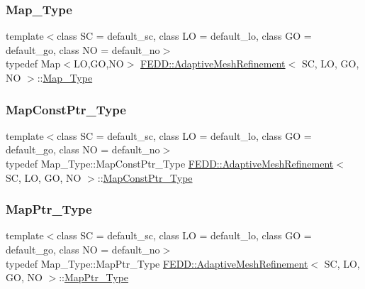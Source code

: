 \subsubsection{\texorpdfstring{Map\+\_\+\+Type}{Map\_Type}}
{\footnotesize\ttfamily template$<$class SC = default\+\_\+sc, class LO = default\+\_\+lo, class GO = default\+\_\+go, class NO = default\+\_\+no$>$ \\
typedef Map$<$LO,GO,NO$>$ \hyperlink{classFEDD_1_1AdaptiveMeshRefinement}{F\+E\+D\+D\+::\+Adaptive\+Mesh\+Refinement}$<$ SC, LO, GO, NO $>$\+::\hyperlink{classFEDD_1_1AdaptiveMeshRefinement_af60419a5ef8a4785991b704d1ad7aacb}{Map\+\_\+\+Type}}

\mbox{\label{classFEDD_1_1AdaptiveMeshRefinement_a584bfb3398e9072ddf188bfa3c04c926}} 
\subsubsection{\texorpdfstring{Map\+Const\+Ptr\+\_\+\+Type}{MapConstPtr\_Type}}
{\footnotesize\ttfamily template$<$class SC = default\+\_\+sc, class LO = default\+\_\+lo, class GO = default\+\_\+go, class NO = default\+\_\+no$>$ \\
typedef Map\+\_\+\+Type\+::\+Map\+Const\+Ptr\+\_\+\+Type \hyperlink{classFEDD_1_1AdaptiveMeshRefinement}{F\+E\+D\+D\+::\+Adaptive\+Mesh\+Refinement}$<$ SC, LO, GO, NO $>$\+::\hyperlink{classFEDD_1_1AdaptiveMeshRefinement_a584bfb3398e9072ddf188bfa3c04c926}{Map\+Const\+Ptr\+\_\+\+Type}}

\mbox{\label{classFEDD_1_1AdaptiveMeshRefinement_a751bcbe2e4fddcdcde836067b776d42d}} 
\subsubsection{\texorpdfstring{Map\+Ptr\+\_\+\+Type}{MapPtr\_Type}}
{\footnotesize\ttfamily template$<$class SC = default\+\_\+sc, class LO = default\+\_\+lo, class GO = default\+\_\+go, class NO = default\+\_\+no$>$ \\
typedef Map\+\_\+\+Type\+::\+Map\+Ptr\+\_\+\+Type \hyperlink{classFEDD_1_1AdaptiveMeshRefinement}{F\+E\+D\+D\+::\+Adaptive\+Mesh\+Refinement}$<$ SC, LO, GO, NO $>$\+::\hyperlink{classFEDD_1_1AdaptiveMeshRefinement_a751bcbe2e4fddcdcde836067b776d42d}{Map\+Ptr\+\_\+\+Type}}

